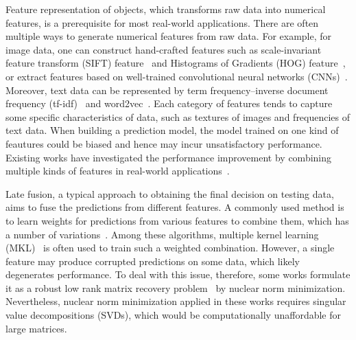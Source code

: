 \documentclass[letterpaper]{article}
\begin{document}
Feature representation of objects, which transforms raw data into numerical features, is a prerequisite for most real-world applications.
There are often multiple ways to generate numerical features from raw data.
For example, for image data, one can construct hand-crafted features such as scale-invariant feature transform
(SIFT) feature~\cite{loweijcv2004distinctive} and Histograms of Gradients (HOG) feature~\cite{dalalcvpr2005histograms},
or extract features based on well-trained convolutional neural networks (CNNs)~\cite{krizhevskynips2012imagenet}.
Moreover, text data can be represented by term frequency–inverse document frequency (tf-idf)~\cite{manning2008introduction} and word2vec~\cite{mikoloviclr2013efficient}.
Each category of features tends to capture some specific characteristics of data,
such as textures of images and frequencies of text data.
When building a prediction model, the model trained on one kind of feautures could be biased and hence may incur unsatisfactory performance.
Existing works have investigated the performance improvement by combining multiple kinds of features in real-world applications~\cite{gehler2009feature,ye2012robust,xuiccv2013feature,lai2015learning}.


Late fusion, a typical approach to obtaining the final decision on testing data, aims to fuse the predictions from different features.
A commonly used method is to learn weights for predictions from various features to combine them, which has a number of variations~\cite{gehler2009feature,xuiccv2013feature,lai2015learning}.
Among these algorithms, multiple kernel learning (MKL)~\cite{lanckriet2004learning,Rakotomamonjy2008Simplemkl} is often used to train such a weighted combination.
However, a single feature may produce corrupted predictions on some data, which likely degenerates performance.
To deal with this issue, therefore, some works formulate it as a robust low rank matrix recovery problem~\cite{gaoijcai2016robust,ye2012robust} by nuclear norm minimization.
Nevertheless, nuclear norm minimization applied in these works requires singular value decompositions (SVDs), which would be computationally unaffordable for large matrices.
\end{document}
